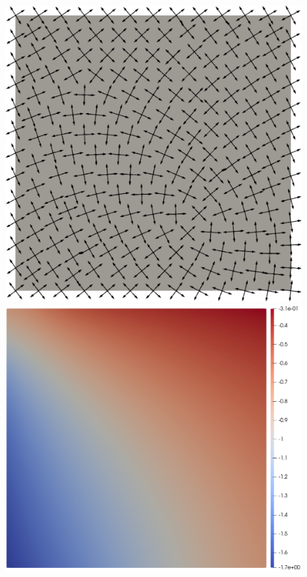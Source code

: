 \begin{figure}[h!]
  \centering
  \includegraphics[scale=0.171]{images/cross_from_repre_field.pdf}
  \hfill
  \includegraphics[scale=0.176]{images/scal_field.pdf}
  \hfill

\end{figure}
